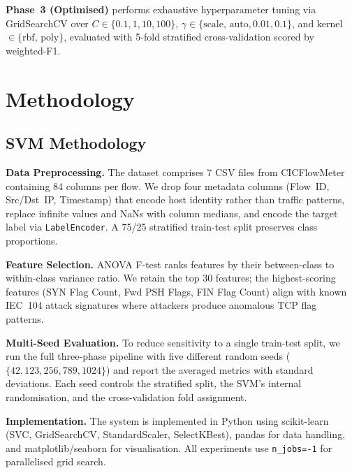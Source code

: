 \documentclass{article}
\begin{document}
\textbf{Phase~3 (Optimised)} performs exhaustive hyperparameter tuning via GridSearchCV over $C \in \{0.1, 1, 10, 100\}$, $\gamma \in \{\text{scale, auto}, 0.01, 0.1\}$, and kernel $\in \{\text{rbf, poly}\}$, evaluated with 5-fold stratified cross-validation scored by weighted-F1.



\section{Methodology}

\subsection{SVM Methodology}

\textbf{Data Preprocessing.}
The dataset comprises 7 CSV files from CICFlowMeter containing 84 columns per flow. We drop four metadata columns (Flow~ID, Src/Dst~IP, Timestamp) that encode host identity rather than traffic patterns, replace infinite values and NaNs with column medians, and encode the target label via \texttt{LabelEncoder}. A 75/25 stratified train-test split preserves class proportions.

\textbf{Feature Selection.}
ANOVA F-test ranks features by their between-class to within-class variance ratio. We retain the top 30 features; the highest-scoring features (SYN Flag Count, Fwd PSH Flags, FIN Flag Count) align with known IEC~104 attack signatures where attackers produce anomalous TCP flag patterns.

\textbf{Multi-Seed Evaluation.}
To reduce sensitivity to a single train-test split, we run the full three-phase pipeline with five different random seeds ($\{42, 123, 256, 789, 1024\}$) and report the averaged metrics with standard deviations. Each seed controls the stratified split, the SVM's internal randomisation, and the cross-validation fold assignment.

\textbf{Implementation.}
The system is implemented in Python using scikit-learn (SVC, GridSearchCV, StandardScaler, SelectKBest), pandas for data handling, and matplotlib/seaborn for visualisation. All experiments use \texttt{n\_jobs=-1} for parallelised grid search.
\end{document}

